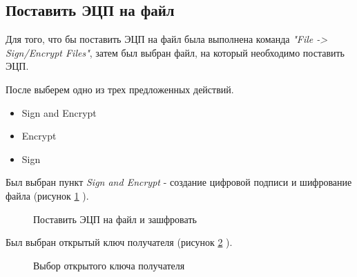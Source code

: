 \documentclass[10pt,a4paper]{report}
\begin{document}
\subsection{Поставить ЭЦП на файл}
Для того, что бы поставить ЭЦП на файл была выполнена команда \textit{"File -> Sign/Encrypt Files"}, затем был выбран файл, на который необходимо поставить ЭЦП.

После выберем одно из трех предложенных действий.
\begin{itemize}
\item Sign and Encrypt
\item Encrypt
\item Sign
\end{itemize} 

Был выбран пункт \textit{Sign and Encrypt} - создание цифровой подписи и шифрование файла (рисунок \ref{ris:image2} ).\\
\begin{figure}[h]
\caption{Поставить ЭЦП на файл и зашфровать}
\label{ris:image2}
\end{figure}

Был выбран открытый ключ получателя (рисунок \ref{ris:image3} ).\\

\begin{figure}[h]
\caption{Выбор открытого ключа получателя}
\label{ris:image3}
\end{figure}
\end{document}

